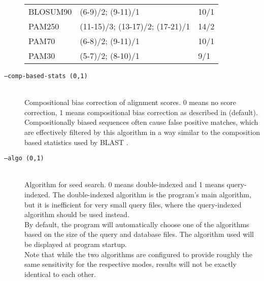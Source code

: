 \documentclass[11pt]{article}
\begin{document}
\begin{description}
\begin{tabular}{l l l}
BLOSUM90 & (6-9)/2; (9-11)/1 & 10/1 \\
PAM250 & (11-15)/3; (13-17)/2; (17-21)/1 & 14/2\\
PAM70 & (6-8)/2; (9-11)/1 & 10/1\\
PAM30 & (5-7)/2; (8-10)/1 & 9/1\\
\hline
\end{tabular}
\item[\texttt{--comp-based-stats (0,1)}]\hfill\\
Compositional bias correction of alignment scores. 0 means no score correction, 1 means compositional bias correction as described in \cite{Hauser2016} (default). Compositionally biased sequences often cause false positive matches, which are effectively filtered by this algorithm in a way similar to the composition based statistics used by BLAST \cite{Yu2005}.
\item[\texttt{--algo (0,1)}]\hfill\\
Algorithm for seed search. 0 means double-indexed and 1 means query-indexed. The double-indexed algorithm is the program's main algorithm, but it is inefficient for very small query files, where the query-indexed algorithm should be used instead.\\
By default, the program will automatically choose one of the algorithms based on the size of the query and database files. The algorithm used will be displayed at program startup.\\
Note that while the two algorithms are configured to provide roughly the same sensitivity for the respective modes, results will not be exactly identical to each other.
\end{description}
\end{document}
